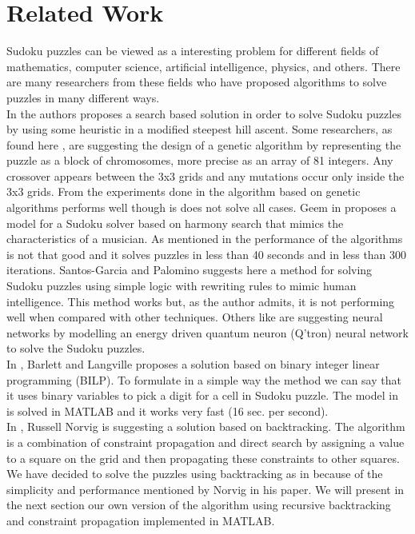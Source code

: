 \documentclass[12pt,a4paper]{article} %
\begin{document}
\section{Related Work}
Sudoku puzzles can be viewed as a interesting problem for different fields of mathematics, computer science, artificial intelligence, physics, and others. There are many researchers from these fields who have proposed algorithms to solve puzzles in many different ways. 
\newline
\\ In \cite{jones2008construction} the authors proposes a search based solution in order to solve Sudoku puzzles by using some heuristic in a modified steepest hill ascent. Some researchers, as found here \cite{mantere2007solving}, are suggesting the design of a genetic algorithm by representing the puzzle as a block of chromosomes, more precise as an array of 81 integers. Any crossover appears between the 3x3 grids and any mutations occur only inside the 3x3 grids. From the experiments done in \cite{mantere2007solving} the algorithm based on genetic algorithms performs well though is does not solve all cases. Geem in \cite{geem2008harmony} proposes a model for a Sudoku solver based on harmony search that mimics the characteristics of a musician. As mentioned in \cite{green2009survey} the performance of the algorithms is not that good and it solves puzzles in less than 40 seconds and in less than 300 iterations. Santos-Garcia and Palomino suggests here \cite{santos2007solving} a method for solving Sudoku puzzles using simple logic with rewriting rules to mimic human intelligence. This method works but, as the author admits, it is not performing well when compared with other techniques. Others like \cite{yue2006sudoku} are suggesting neural networks by modelling an energy driven quantum neuron (Q'tron) neural network to solve the Sudoku puzzles. 
\newline
\\ In \cite{bartlett2006integer}, Barlett and Langville proposes a solution based on binary integer linear programming (BILP). To formulate in a simple way the method we can say that it uses binary variables to pick a digit for a cell in Sudoku puzzle. The model in \cite{bartlett2006integer} is solved in MATLAB and it works very fast (16 sec. per second).
\newline
\\ In \cite{norvigsolving}, Russell Norvig is suggesting a solution based on backtracking. The algorithm is a combination of constraint propagation and direct search by assigning a value to a square on the grid and then propagating these constraints to other squares.
\newline
\\ We have decided to solve the puzzles using backtracking as in \cite{norvigsolving} because of the simplicity and performance mentioned by Norvig in his paper. We will present in the next section our own version of the algorithm using recursive backtracking and constraint propagation implemented in MATLAB.
\end{document}
